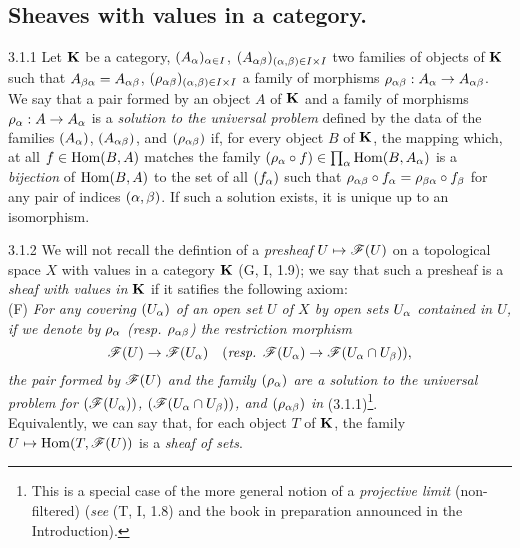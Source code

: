 \documentclass[../main.tex]{subfiles}
\begin{document}
\subsection{Sheaves with values in a category.}

\begin{cx}{3.1.1}
Let $\mathbf{K}$ be a category, $(A_\alpha)_{\alpha\in I}$,
$(A_{\alpha\beta})_{(\alpha,\beta)\in I\times I}$ two families of objects
of $\mathbf{K}$ such that $A_{\beta\alpha}=A_{\alpha\beta}$,
$(\rho_{\alpha\beta})_{(\alpha,\beta)\in I\times I}$ a family of morphisms
$\rho_{\alpha\beta}:A_\alpha\to A_{\alpha\beta}$. We say that a pair formed by
an object $A$ of $\mathbf{K}$ and a family of morphisms $\rho_\alpha:A\to A_\alpha$ 
is a \emph{solution to the universal problem} defined by the data of the families
$(A_\alpha)$, $(A_{\alpha\beta})$, and $(\rho_{\alpha\beta})$ if, for every object $B$
of $\mathbf{K}$, the mapping which, at all $f\in\operatorname*{Hom}(B,A)$ matches the
family $(\rho_\alpha\circ f)\in\prod_\alpha\operatorname*{Hom}(B,A_\alpha)$ is a \emph{bijection}
of $\operatorname*{Hom}(B,A)$ to the set of all $(f_\alpha)$ such that
$\rho_{\alpha\beta}\circ f_\alpha=\rho_{\beta\alpha}\circ f_\beta$ for any pair of
indices $(\alpha,\beta)$. If such a solution exists, it is unique up to an isomorphism.
\end{cx}

\begin{cx}{3.1.2}
We will not recall the defintion of a \emph{presheaf} $U\mapsto\mathscr{F}(U)$ on a
topological space $X$ with values in a category $\mathbf{K}$ (G, I, 1.9); we say that
such a presheaf is a \emph{sheaf with values in} $\mathbf{K}$ if it satifies the following
axiom:\\

(F) \emph{For any covering $(U_\alpha)$ of an open set $U$ of $X$ by open sets
   $U_\alpha$ contained in $U$, if we denote by $\rho_\alpha$ (resp. $\rho_{\alpha\beta}$) the
   restriction morphism}
   \[
     \mathscr{F}(U)\to\mathscr{F}(U_\alpha)\quad(\text{\emph{resp. }}\mathscr{F}(U_\alpha)\to\mathscr{F}(U_\alpha\cap U_\beta)),
   \]
   \emph{the pair formed by $\mathscr{F}(U)$ and the family $(\rho_\alpha)$ are a solution to
   the universal problem for $(\mathscr{F}(U_\alpha))$, $(\mathscr{F}(U_\alpha\cap U_\beta))$, and $(\rho_{\alpha\beta})$
   in} (3.1.1)\footnote{This is a special case of the more general notion of a
   \emph{projective limit} (non-filtered) (\emph{see} (T, I, 1.8) and the book in
   preparation announced in the Introduction).}.\\

Equivalently, we can say that, for each object $T$ of $\mathbf{K}$, the family
$U\mapsto\operatorname*{Hom}(T,\mathscr{F}(U))$ is a \emph{sheaf of sets}.
\end{cx}
\end{document}

